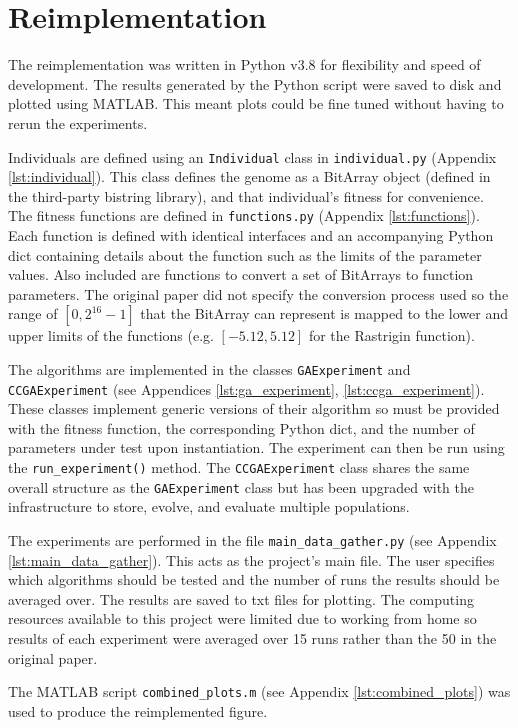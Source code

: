 \section{Reimplementation} \label{sec:reimplementation}

The reimplementation was written in Python v3.8 for flexibility and speed of development.
The results generated by the Python script were saved to disk and plotted using MATLAB.
This meant plots could be fine tuned without having to rerun the experiments.

Individuals are defined using an \texttt{Individual} class in \texttt{individual.py} (Appendix \ref{lst:individual}). 
This class defines the genome as a BitArray object (defined in the third-party bistring library\cite{bistring-repo}), and that individual's fitness for convenience.
The fitness functions are defined in \texttt{functions.py} (Appendix \ref{lst:functions}). 
Each function is defined with identical interfaces and an accompanying Python dict containing details about the function such as the limits of the parameter values.
Also included are functions to convert a set of BitArrays to function parameters.
The original paper did not specify the conversion process used so the range of $[0, 2^{16} - 1]$ that the BitArray can represent is mapped to the lower and upper limits of the functions (e.g. $[-5.12, 5.12]$ for the Rastrigin function).

The algorithms are implemented in the classes \texttt{GAExperiment} and \texttt{CCGAExperiment} (see Appendices \ref{lst:ga_experiment}, \ref{lst:ccga_experiment}). 
These classes implement generic versions of their algorithm so must be provided with the fitness function, the corresponding Python dict, and the number of parameters under test upon instantiation.
The experiment can then be run using the \texttt{run\_experiment()} method.
The \texttt{CCGAExperiment} class shares the same overall structure as the \texttt{GAExperiment} class but has been upgraded with the infrastructure to store, evolve, and evaluate multiple populations.

The experiments are performed in the file \texttt{main_data_gather.py} (see Appendix \ref{lst:main_data_gather}).
This acts as the project's main file.
The user specifies which algorithms should be tested and the number of runs the results should be averaged over.
The results are saved to txt files for plotting.
The computing resources available to this project were limited due to working from home so results of each experiment were averaged over 15 runs rather than the 50 in the original paper.

The MATLAB script \texttt{combined_plots.m} (see Appendix \ref{lst:combined_plots}) was used to produce the reimplemented figure.
